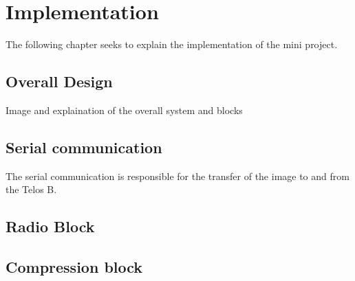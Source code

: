 \chapter{Implementation}
The following chapter seeks to explain the implementation of the mini project.\\

\section{Overall Design}
Image and explaination of the overall system and blocks\\

\section{Serial communication}
The serial communication is responsible for the transfer of the image to and from the Telos B. 

\section{Radio Block}

\section{Compression block}


